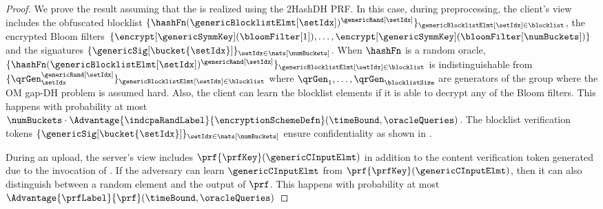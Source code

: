 \begin{proof}

We prove the result assuming that the \oprfFunc is realized using the 2HashDH PRF. In this case, during preprocessing, 
the client's view includes the obfuscated blocklist  $\{ \hashFn(\genericBlocklistElmt[\setIdx])^{\genericRand[\setIdx]}\}_{\genericBlocklistElmt[\setIdx] \in \blocklist}$, the encrypted Bloom filters $\{\encrypt[\genericSymmKey](\bloomFilter[1]), \dots, \encrypt[\genericSymmKey](\bloomFilter[\numBuckets])\}$ and the signatures $\{ \genericSig[\bucket{\setIdx}] \}_{\setIdx \in \nats[\numBuckets]}$. When $\hashFn$ is a random oracle, $\{ \hashFn(\genericBlocklistElmt[\setIdx])^{\genericRand[\setIdx]}\}_{\genericBlocklistElmt[\setIdx] \in \blocklist}$ is indistinguishable from 
$\{\qrGen_\setIdx^{\genericRand[\setIdx]}\}_{\genericBlocklistElmt[\setIdx] \in \blocklist}$ where $\qrGen_1, \dots, \qrGen_\blocklistSize$ are generators of the group \group where the OM gap-DH problem is assumed hard. Also, the client can learn the blocklist elements if it is able to decrypt any of the Bloom filters. This happens with probability at most $\numBuckets \cdot \Advantage{\indcpaRandLabel}{\encryptionSchemeDefn}(\timeBound, \oracleQueries)$. 
The blocklist verification tokens $\{ \genericSig[\bucket{\setIdx}] \}_{\setIdx \in \nats[\numBuckets]}$ ensure confidentiality as shown in . 

During an upload, the server's view includes $\prf{\prfKey}(\genericCInputElmt)$ in addition to the content verification token generated due to the 
invocation of \protocolEM. If the adversary can learn $\genericCInputElmt$ from $\prf{\prfKey}(\genericCInputElmt)$, then it can also distinguish between a random element and the output of $\prf$. This happens with probability at most $\Advantage{\prfLabel}{\prf}(\timeBound, \oracleQueries)$

\end{proof}


